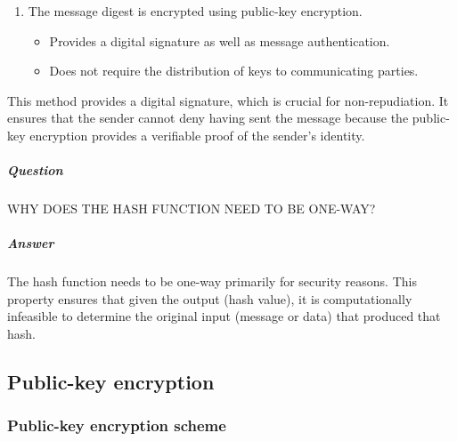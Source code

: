 \documentclass{article}
\begin{document}
                        \begin{enumerate}
                            \item The message digest is encrypted using public-key encryption.
                            \begin{itemize}
                                \item Provides a digital signature as well as message authentication.
                                \item Does not require the distribution of keys to communicating parties.
                            \end{itemize}
                        \end{enumerate}
                        
                        This method provides a digital signature, which is crucial for non-repudiation. It ensures that the sender cannot deny having sent the message because the public-key encryption provides a verifiable proof of the sender's identity.
                        \subparagraph{Question}
                        WHY DOES THE HASH FUNCTION  NEED TO BE ONE-WAY?
                        \subparagraph{Answer}
                        The hash function needs to be one-way primarily for security reasons. This property ensures that given the output (hash value), it is computationally infeasible to determine the original input (message or data) that produced that hash.
                \subsection{Public-key encryption}
                            \subsubsection{Public-key encryption scheme}
\end{document}
